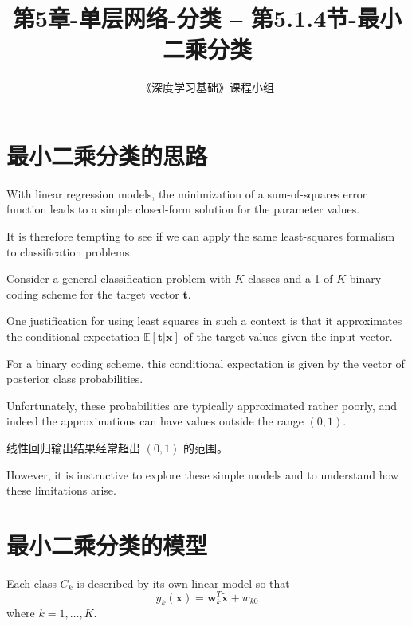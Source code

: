 \documentclass{article}
\title{第5章-单层网络-分类 -- 第5.1.4节-最小二乘分类}
\author{《深度学习基础》课程小组}
\begin{document}
\maketitle
\tableofcontents


\section{最小二乘分类的思路}

With linear regression models, the minimization of a sum-of-squares error function leads to a simple closed-form solution for the parameter values. 

It is therefore tempting to see if we can apply the same least-squares formalism to classification problems. 

Consider a general classification problem with $K$ classes and a 1-of-$K$ binary coding scheme for the target vector $\mathbf{t}$. 

One justification for using least squares in such a context is that it approximates the conditional expectation $\mathbb{E}[\mathbf{t}|\mathbf{x}]$ of the target values given the input vector. 

For a binary coding scheme, this conditional expectation is given by the vector of posterior class probabilities. 

Unfortunately, these probabilities are typically approximated rather poorly, and indeed the approximations can have values outside the range $(0,1)$. 

{\color{red} 线性回归输出结果经常超出 $(0,1)$ 的范围。}

However, it is instructive to explore these simple models and to understand how these limitations arise.


\section{最小二乘分类的模型}

Each class $C_k$ is described by its own linear model so that
\begin{equation}
y_k(\mathbf{x}) = \mathbf{w}_k^T \widetilde{\mathbf{x}} + w_{k0}
\tag{5.12}
\end{equation}
where $k = 1, \ldots, K$. 
\end{document}
